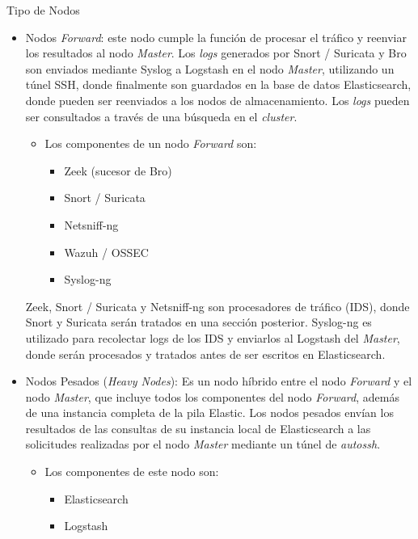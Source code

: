 \begin{subsubsection}{Tipo de Nodos}
\begin{itemize}
          \item Nodos \textit{Forward}: este nodo cumple la función de procesar el tráfico y reenviar los resultados al nodo \textit{Master}. Los \textit{logs} generados por Snort / Suricata y Bro son enviados mediante Syslog a Logstash en el nodo \textit{Master}, utilizando un túnel SSH, donde finalmente son guardados en la base de datos Elasticsearch, donde pueden ser reenviados a los nodos de almacenamiento. Los \textit{logs} pueden ser consultados a través de una búsqueda en el \textit{cluster}.
            \begin{itemize}
               \item Los componentes de un nodo \textit{Forward} son:
               \begin{itemize}
                   \item Zeek \cite{zeek} (sucesor de Bro)
                   \item Snort \cite{snort} / Suricata \cite{suricata}
                   \item Netsniff-ng \cite{netsniff-ng}
                   \item Wazuh \cite{wazuh} / OSSEC \cite{ossec}
                   \item Syslog-ng \cite{syslog-ng}
               \end{itemize}
            \end{itemize}
            Zeek, Snort / Suricata y Netsniff-ng son procesadores de tráfico (IDS), donde Snort y Suricata serán tratados en una sección posterior. Syslog-ng es utilizado para recolectar logs de los IDS y enviarlos al Logstash del \textit{Master}, donde serán procesados y tratados antes de ser escritos en Elasticsearch.
            \item Nodos Pesados (\textit{Heavy Nodes}): Es un nodo híbrido entre el nodo \textit{Forward} y el nodo \textit{Master}, que incluye todos los componentes del nodo \textit{Forward}, además de una instancia completa de la pila Elastic. Los nodos pesados envían los resultados de las consultas de su instancia local de Elasticsearch a las solicitudes realizadas por el nodo \textit{Master} mediante un túnel de \textit{autossh}.
            \begin{itemize}
                \item Los componentes de este nodo son:
                \begin{itemize}
                    \item Elasticsearch
                    \item Logstash

\end{itemize}
\end{itemize}
\end{itemize}
\end{subsubsection}
